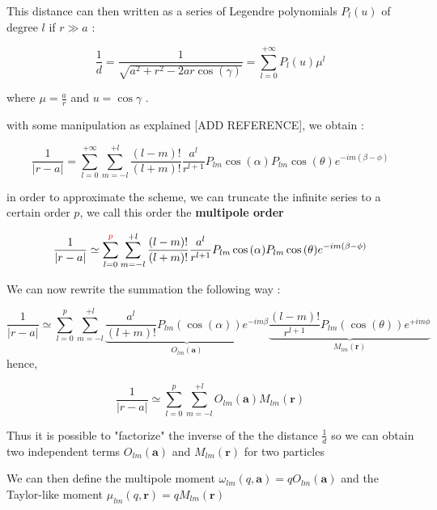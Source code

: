 \documentclass[12pt,twoside,a4paper]{report}
\begin{document}
	This distance can then written as a series of Legendre polynomials  $P_l(u)$ of degree $l$ if $r \gg a$ :
	
	\begin{equation}
		\frac{1}{d} = \frac{1}{\sqrt{a^2 + r^2 - 2ar \cos(\gamma)}} = \sum\limits_{l=0}^{+\infty} P_l(u)\mu^l
	\end{equation}
	
	
	where $\mu = \frac{a}{r}$ and $u = \cos{\gamma}$ .
	
	with some manipulation as explained [ADD REFERENCE], we obtain : 
	
	\begin{equation}
	\frac{1}{|r - a|} = \sum\limits_{l=0}^{+\infty} \sum\limits_{m = -l}^{+l} \frac{(l-m)!}{(l+m)!} \frac{a^l}{r^{l+1}} P_{lm}\cos{(\alpha)}P_{lm}\cos{(\theta)}e^{-im(\beta - \phi)}
	\end{equation}
	
	in order to approximate the scheme, we can truncate the infinite series to a certain order $p$, we call this order the \textbf{multipole order}
	
	\begin{equation}
	\frac{1}{|r - a|} \simeq \sum\limits_{l=0}^{\textcolor{red}{p}} \sum\limits_{m = -l}^{+l} \frac{(l-m)!}{(l+m)!} \frac{a^l}{r^{l+1}} P_{lm}\cos{(\alpha)}P_{lm}\cos{(\theta)}e^{-im(\beta - \phi)}
	\end{equation}
	
	We can now rewrite the summation the following way :
	
		\begin{equation}
	\frac{1}{|r - a|} \simeq \sum\limits_{l=0}^{p} \sum\limits_{m = -l}^{+l}
	\underbrace{\frac{a^l}{(l+m)!} P_{lm}(\cos(\alpha))e^{-im\beta}} _{O_{lm}(\textbf{a})}
    \underbrace{\frac{(l-m)!}{r^{l+1}} P_{lm}(\cos(\theta))e^{+im\phi}} _{M_{lm}(\textbf{r})}
	\end{equation}
	hence,
	
		\begin{equation}
	\frac{1}{|r - a|} \simeq \sum\limits_{l=0}^{p} \sum\limits_{m = -l}^{+l}
	{O_{lm}(\textbf{a})}
    {M_{lm}(\textbf{r})}
	\end{equation}
	
	
	Thus it is possible to "factorize" the inverse of the the distance $\frac{1}{d}$ so we can obtain two independent terms ${O_{lm}(\textbf{a})}$ and ${M_{lm}(\textbf{r})}$  for two particles 


	We can then define the multipole moment $\omega_{lm}(q,\textbf{a}) = q O_{lm}(\textbf{a})$ and the Taylor-like moment $\mu_{lm}(q,\textbf{r}) = q M_{lm}(\textbf{r})$
	
\end{document}
